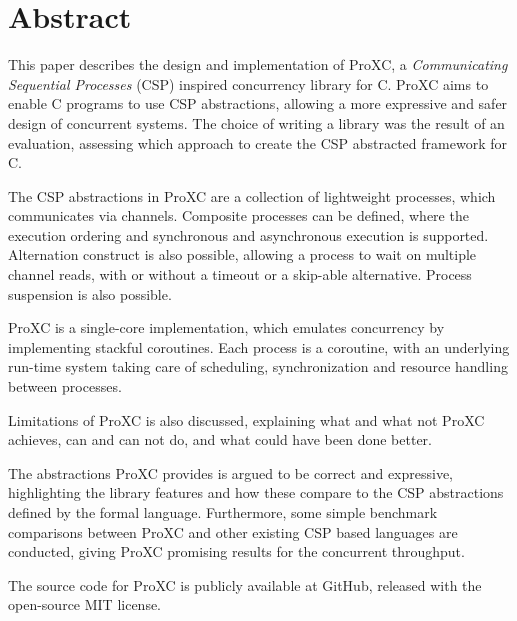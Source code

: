 
\newpage
{}
\section*{Abstract}

This paper describes the design and implementation of ProXC, a \textit{Communicating Sequential Processes} (CSP) inspired concurrency library for C. ProXC aims to enable C programs to use CSP abstractions, allowing a more expressive and safer design of concurrent systems. The choice of writing a library was the result of an evaluation, assessing which approach to create the CSP abstracted framework for C. 

The CSP abstractions in ProXC are a collection of lightweight processes, which communicates via channels. Composite processes can be defined, where the execution ordering and synchronous and asynchronous execution is supported. Alternation construct is also possible, allowing a process to wait on multiple channel reads, with or without a timeout or a skip-able alternative. Process suspension is also possible. 

ProXC is a single\hyp{}core implementation, which emulates concurrency by implementing stackful coroutines. Each process is a coroutine, with an underlying run\hyp{}time system taking care of scheduling, synchronization and resource handling between processes. 

Limitations of ProXC is also discussed, explaining what and what not ProXC achieves, can and can not do, and what could have been done better.

The abstractions ProXC provides is argued to be correct and expressive, highlighting the library features and how these compare to the CSP abstractions defined by the formal language. Furthermore, some simple benchmark comparisons between ProXC and other existing CSP based languages are conducted, giving ProXC promising results for the concurrent throughput. 

The source code for ProXC is publicly available at GitHub, released with the open\hyp{}source MIT license. 


\vfill
